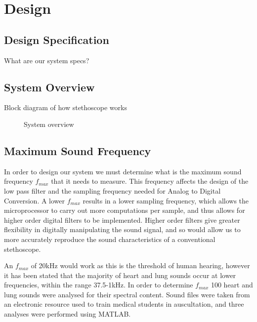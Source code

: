 \chapter{Design} \label{design}

\section{Design Specification}
What are our system specs?

\section{System Overview}
Block diagram of how stethoscope works
\begin{figure}[!htb]
	\centering
	\caption{System overview}
	\label{fig:sys_overview}
\end{figure}

\section{Maximum Sound Frequency}
In order to design our system we must determine what is the maximum sound frequency $f_{max}$ that it needs to measure. This frequency affects the design of the low pass filter and the sampling frequency needed for Analog to Digital Conversion. A lower $f_{max}$ results in a lower sampling frequency, which allows the microprocessor to carry out more computations per sample, and thus allows for higher order digital filters to be implemented. Higher order filters give greater flexibility in digitally manipulating the sound signal, and so would allow us to more accurately reproduce the sound characteristics of a conventional stethoscope.

An $f_{max}$ of 20kHz would work as this is the threshold of human hearing\cite[p.~163]{Stuart2011}, however it has been stated that the majority of heart and lung sounds occur at lower frequencies, within the range 37.5-1kHz\cite{Abella1992}. In order to determine $f_{max}$ 100 heart and lung sounds were analysed for their spectral content. Sound files were taken from an electronic resource used to train medical students in auscultation\cite{Coviello2014}, and three analyses were performed using MATLAB. 

